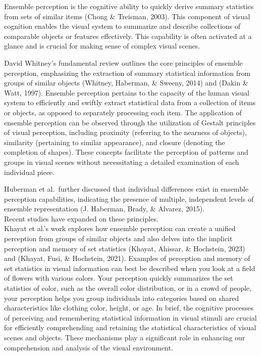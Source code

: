 \documentclass[print]{nuthesis}
\begin{document}
Ensemble perception is the cognitive ability to quickly derive summary statistics from sets of similar items (Chong \& Treisman, 2003).
This component of visual cognition enables the visual system to summarize and describe collections of comparable objects or features effectively.
This capability is often activated at a glance and is crucial for making sense of complex visual scenes.

David Whitney's fundamental review outlines the core principles of ensemble perception, emphasizing the extraction of summary statistical information from groups of similar objects (Whitney, Haberman, \& Sweeny, 2014) and (Dakin \& Watt, 1997).
Ensemble perception pertains to the capacity of the human visual system to efficiently and swiftly extract statistical data from a collection of items or objects, as opposed to separately processing each item.
The application of ensemble perception can be observed through the utilization of Gestalt principles of visual perception, including proximity (referring to the nearness of objects), similarity (pertaining to similar appearance), and closure (denoting the completion of shapes).
These concepts facilitate the perception of patterns and groups in visual scenes without necessitating a detailed examination of each individual piece.

Huberman et al.~further discussed that individual differences exist in ensemble perception capabilities, indicating the presence of multiple, independent levels of ensemble representation (J. Haberman, Brady, \& Alvarez, 2015).\\
Recent studies have expanded on these principles.\\
Khayat et al.'s work explores how ensemble perception can create a unified perception from groups of similar objects and also delves into the implicit perception and memory of set statistics (Khayat, Ahissar, \& Hochstein, 2023) and (Khayat, Fusi, \& Hochstein, 2021).
Examples of perception and memory of set statistics in visual information can best be described when you look at a field of flowers with various colors.
Your perception quickly summarizes the set statistics of color, such as the overall color distribution, or in a crowd of people, your perception helps you group individuals into categories based on shared characteristics like clothing color, height, or age.
In brief, the cognitive processes of perceiving and remembering statistical information in visual stimuli are crucial for efficiently comprehending and retaining the statistical characteristics of visual scenes and objects.
These mechanisms play a significant role in enhancing our comprehension and analysis of the visual environment.
\end{document}
